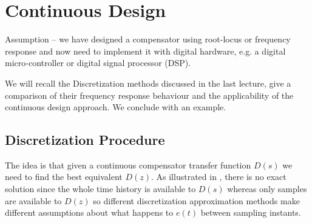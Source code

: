 \begin{slide}\label{slide:l12s4}
  \begin{center}
  \end{center}
\end{slide}


\section*{Continuous Design}

Assumption -- we have designed a compensator using root-locus or frequency response and now need to implement it with digital hardware, e.g. a digital micro-controller or digital signal processor (DSP).

We will recall the Discretization methods discussed in the last lecture, give a comparison of their frequency response behaviour and the applicability of the continuous design approach. We conclude with an example.

\subsection*{Discretization Procedure}

The idea is that given a continuous compensator transfer function $D(s)$ we need to find the best equivalent $D(z)$. As illustrated in , there is no exact solution since the whole time history is available to $D(s)$ whereas only samples are available to $D(z)$ so different discretization approximation methods make different assumptions about what happens to $e(t)$ between sampling instants.

